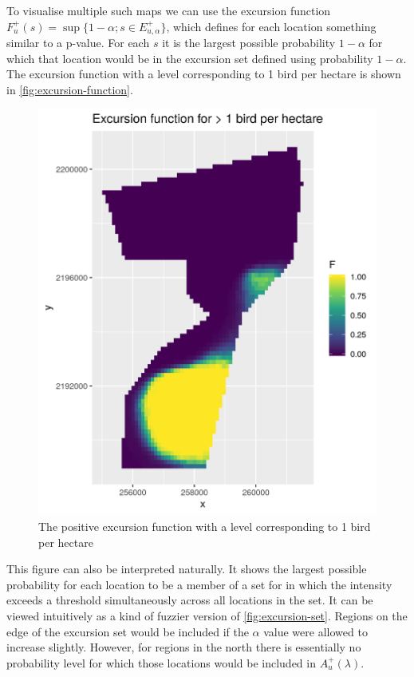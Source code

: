 \documentclass[preprint,12pt]{elsarticle}
\begin{document}
To visualise multiple such maps we can use the excursion function $F_u^{+}(s) = \sup \{1 - \alpha ; s \in E_{u,\alpha}^+ \}$, which defines for each location something similar to a p-value.  For each $s$ it is the largest possible probability $1 -\alpha$ for which that location would be in the excursion set defined using probability $1 - \alpha$.  The excursion function with a level corresponding to 1 bird per hectare is shown in \autoref{fig:excursion-function}.

\begin{figure}
	\includegraphics[scale=0.5]{figures/excursion_function.png}
	\caption{The positive excursion function with a level corresponding to 1 bird per hectare}
	\label{fig:excursion-function}
\end{figure}

This figure can also be interpreted naturally.  It shows the largest possible probability for each location to be a member of a set for in which the intensity exceeds a threshold simultaneously across all locations in the set.  It can be viewed intuitively as a kind of fuzzier version of \autoref{fig:excursion-set}.  Regions on the edge of the excursion set would be included if the $\alpha$ value were allowed to increase slightly.  However, for regions in the north there is essentially no probability level for which those locations would be included in $A_u^{+}(\lambda)$.
\end{document}
